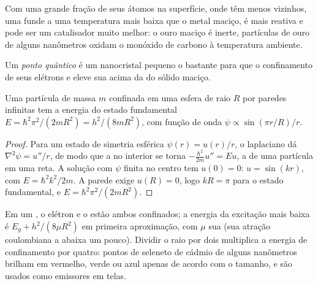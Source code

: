 Com uma grande fração de seus átomos na superfície, onde têm menos
vizinhos, uma  funde a uma temperatura mais baixa que o metal maciço,
é mais reativa e pode ser um catalisador muito melhor: o ouro maciço é inerte, partículas de
ouro de alguns nanômetros oxidam o monóxido de carbono à temperatura ambiente.

\begin{definition}\label{def:b3:inorganic-materials:quantum-dot}
Um \emph{ponto quântico} é um nanocristal  pequeno
o bastante para que o confinamento de seus elétrons e  eleve sua 
acima da do sólido maciço.
\end{definition}

\begin{theorem}\label{thm:b3:inorganic-materials:quantum-dot}
Uma partícula de massa $m$ confinada em uma esfera de raio $R$ por paredes infinitas tem
a energia do estado fundamental $E = \hbar^2\pi^2/(2mR^2) = h^2/(8mR^2)$, com função de onda $\psi \propto \sin(\pi r/R)/r$.
\end{theorem}

\begin{proof}
Para um estado de simetria esférica $\psi(r) = u(r)/r$, o laplaciano dá
$\nabla^2\psi = u''/r$, de modo que a  no interior se torna $-\frac{\hbar^2}{2m}u'' = Eu$, a de uma partícula em uma
reta. A solução com $\psi$ finita no centro tem $u(0) = 0$: $u = \sin(kr)$, com $E = \hbar^2k^2/2m$.
A parede exige $u(R) = 0$, logo $kR = \pi$ para o estado fundamental, e $E = \hbar^2\pi^2/(2mR^2)$.
\end{proof}

Em um , o elétron e o  estão ambos confinados; a energia da
excitação mais baixa é $E_g + h^2/(8\mu R^2)$ em primeira aproximação, com $\mu$ sua  (sua atração coulombiana a abaixa um pouco). Dividir o raio por dois
multiplica a energia de confinamento por quatro: pontos de seleneto de cádmio de alguns
nanômetros brilham em vermelho, verde ou azul apenas de acordo com o tamanho, e são usados como
emissores em telas.

